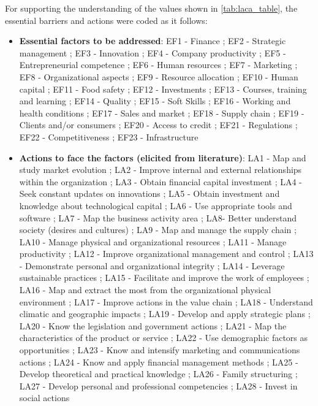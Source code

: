 \begin{table}[h!]
\begin{tabular}{|l|*{23}{c|}}
        \end{tabular}
    \label{tab:laca_table}
\end{table}


For supporting the understanding of the values shown in \autoref{tab:laca_table}, the essential barriers and actions were coded as it follows:

\begin{itemize} 
\item \textbf{Essential factors to be addressed}: 
EF1 - Finance
; EF2 - Strategic management
; EF3 - Innovation
; EF4 - Company productivity
; EF5 - Entrepreneurial competence
; EF6 - Human resources
; EF7 - Marketing
; EF8 - Organizational aspects
; EF9 - Resource allocation
; EF10 - Human capital
; EF11 - Food safety
; EF12 - Investments
; EF13 - Courses, training and learning
; EF14 - Quality
; EF15 - Soft Skills
; EF16 - Working and health conditions
; EF17 - Sales and market
; EF18 - Supply chain
; EF19 - Clients and/or consumers
; EF20 - Access to credit
; EF21 - Regulations
; EF22 - Competitiveness
; EF23 - Infrastructure


\item \textbf{Actions to face the factors (elicited from literature)}: 
LA1 - Map and study market evolution
;  LA2 - Improve internal and external relationships within the organization
;  LA3 - Obtain financial capital investment
;  LA4 - Seek constant updates on innovations
;  LA5 - Obtain investment and knowledge about technological capital
;  LA6 - Use appropriate tools and software
;  LA7 - Map the business activity area
;  LA8- Better understand society (desires and cultures)
;  LA9 - Map and manage the supply chain
;  LA10 - Manage physical and organizational resources
;  LA11 - Manage productivity
;  LA12 - Improve organizational management and control
;  LA13 - Demonstrate personal and organizational integrity
;  LA14 - Leverage sustainable practices
;  LA15 - Facilitate and improve the work of employees
;  LA16 - Map and extract the most from the organizational physical environment
;  LA17 - Improve actions in the value chain
;  LA18 - Understand climatic and geographic impacts
;  LA19 - Develop and apply strategic plans
;  LA20 - Know the legislation and government actions
;  LA21 - Map the characteristics of the product or service
;  LA22 - Use demographic factors as opportunities
;  LA23 - Know and intensify marketing and communications actions
;  LA24 - Know and apply financial management methods
;  LA25 - Develop theoretical and practical knowledge
;  LA26 - Family structuring
;  LA27 - Develop personal and professional competencies 
;  LA28 - Invest in social actions



\end{itemize}
